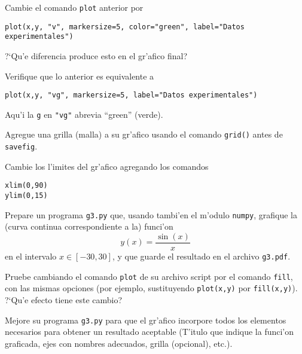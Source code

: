 \documentclass[11pt]{exam}
\begin{document}
\begin{questions}
\item Cambie el comando \texttt{plot} anterior por 
\begin{verbatim}
plot(x,y, "v", markersize=5, color="green", label="Datos experimentales")
\end{verbatim}
?`Qu'e diferencia produce esto en el gr'afico final?
\item Verifique que lo anterior es equivalente a
\begin{verbatim}
plot(x,y, "vg", markersize=5, label="Datos experimentales")
\end{verbatim}
Aqu'i la \texttt{g} en \texttt{"vg"} abrevia ``green'' (verde).
\item Agregue una grilla (malla) a su gr'afico usando el comando \texttt{grid()} antes de \texttt{savefig}.
\item Cambie los l'imites del gr'afico agregando los comandos
\begin{verbatim}
xlim(0,90)
ylim(0,15)
\end{verbatim}
\item Prepare un programa \texttt{g3.py} que, usando tambi'en el m'odulo \texttt{numpy}, grafique la (curva continua correspondiente a la) funci'on
\begin{equation}
y(x)=\frac{\sin(x)}{x}
\end{equation}
en el intervalo $x\in[-30,30]$, y que guarde el resultado en el archivo \texttt{g3.pdf}.

\item Pruebe cambiando el comando \texttt{plot} de su archivo script por el comando \texttt{fill}, con las mismas opciones (por ejemplo, sustituyendo \texttt{plot(x,y)} por \texttt{fill(x,y)}). ?`Qu'e efecto tiene este cambio?

\item Mejore su programa \texttt{g3.py} para que el gr'afico incorpore todos los elementos necesarios para obtener un resultado aceptable (T'itulo que indique la funci'on graficada, ejes con nombres adecuados, grilla (opcional), etc.).


\end{questions}
\end{document}
